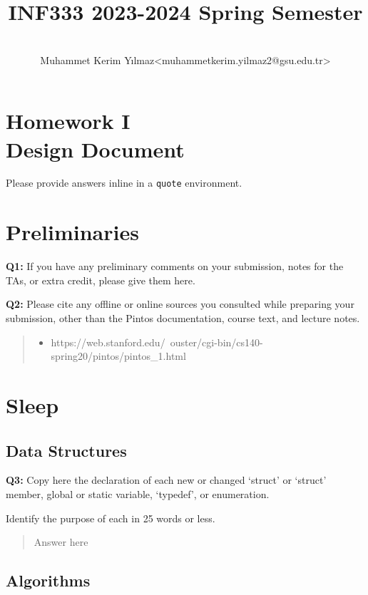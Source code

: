 \documentclass[a4paper,11pt]{paper}
\title{INF333 2023-2024 Spring Semester}
\author{
\textbf{\color{blue}{Lone Wolf}} {\small}
\\ Muhammet Kerim Yılmaz<muhammetkerim.yilmaz2@gsu.edu.tr>
}
\begin{document}
\maketitle

\section*{\LARGE Homework I \\
Design Document}

Please provide answers inline in a \texttt{quote} environment.


\section{Preliminaries}

\textbf{Q1:} If you have any preliminary comments on your submission, notes for
the TAs, or extra credit, please give them here.
\begin{quote}
\end{quote}


\textbf{Q2:} Please cite any offline or online sources you consulted while
preparing your submission, other than the Pintos documentation, course text, and
lecture notes.

\begin{quote}
  \begin{itemize}
    \item https://web.stanford.edu/~ouster/cgi-bin/cs140-spring20/pintos/pintos_1.html
\end{itemize}

\end{quote}


\section{Sleep}

\subsection{Data Structures}

\textbf{Q3:} Copy here the declaration of each new or changed `struct' or
`struct' member, global or static variable, `typedef', or enumeration.

Identify the purpose of each in 25 words or less.
\begin{quote}
  Answer here
\end{quote}


\subsection{Algorithms}
\end{document}

